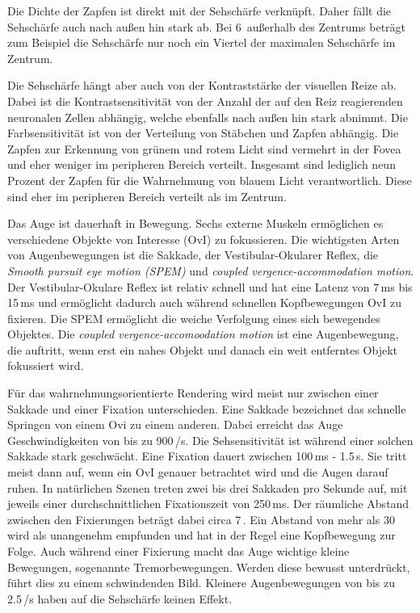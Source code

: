 Die Dichte der Zapfen ist direkt mit der Sehschärfe verknüpft.
Daher fällt die Sehschärfe auch nach außen hin stark ab.
Bei 6\,\textdegree{} außerhalb des Zentrums beträgt zum Beispiel die Sehschärfe nur noch ein Viertel der maximalen Sehschärfe im Zentrum.

Die Sehschärfe hängt aber auch von der Kontraststärke der visuellen Reize ab.
Dabei ist die Kontrastsensitivität von der Anzahl der auf den Reiz reagierenden neuronalen Zellen abhängig, welche ebenfalls nach außen hin stark abnimmt.
Die Farbsensitivität ist von der Verteilung von Stäbchen und Zapfen abhängig.
Die Zapfen zur Erkennung von grünem und rotem Licht sind vermehrt in der Fovea und eher weniger im peripheren Bereich verteilt.
Insgesamt sind lediglich neun Prozent der Zapfen für die Wahrnehmung von blauem Licht verantwortlich.
Diese sind eher im peripheren Bereich verteilt als im Zentrum.

Das Auge ist dauerhaft in Bewegung.
Sechs externe Muskeln ermöglichen es verschiedene Objekte von Interesse (OvI) zu fokussieren.
Die wichtigsten Arten von Augenbewegungen ist die Sakkade, der Vestibular-Okularer Reflex, die \emph{Smooth pursuit eye motion (SPEM)} und \emph{coupled vergence-accommodation motion}.
Der Vestibular-Okulare Reflex ist relativ schnell und hat eine Latenz von 7\,ms bis 15\,ms und ermöglicht dadurch auch während schnellen Kopfbewegungen OvI zu fixieren.
Die SPEM ermöglicht die weiche Verfolgung eines sich bewegendes Objektes.
Die \emph{coupled vergence-accomoodation motion} ist eine Augenbewegung, die auftritt, wenn erst ein nahes Objekt und danach ein weit entferntes Objekt fokussiert wird.

Für das wahrnehmungsorientierte Rendering wird meist nur zwischen einer Sakkade und einer Fixation unterschieden.
Eine Sakkade bezeichnet das schnelle Springen von einem Ovi zu einem anderen.
Dabei erreicht das Auge Geschwindigkeiten von bis zu 900\,\textdegree/s.
Die Sehsensitivität ist während einer solchen Sakkade stark geschwächt.
Eine Fixation dauert zwischen 100\,ms - 1.5\,s.
Sie tritt meist dann auf, wenn ein OvI genauer betrachtet wird und die Augen darauf ruhen.
In natürlichen Szenen treten zwei bis drei Sakkaden pro Sekunde auf, mit jeweils einer durchschnittlichen Fixationszeit von 250\,ms.
Der räumliche Abstand zwischen den Fixierungen beträgt dabei circa 7\,\textdegree{}.
Ein Abstand von mehr als 30\,\textdegree{} wird als unangenehm empfunden und hat in der Regel eine Kopfbewegung zur Folge.
Auch während einer Fixierung macht das Auge wichtige kleine Bewegungen, sogenannte Tremorbewegungen.
Werden diese bewusst unterdrückt, führt dies zu einem schwindenden Bild.
Kleinere Augenbewegungen von bis zu 2.5\,\textdegree{}/s haben auf die Sehschärfe keinen Effekt.

